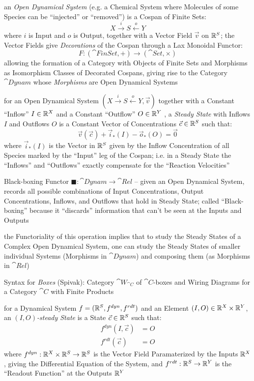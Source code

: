 an \emph{Open Dynamical System} (e.g. a Chemical System where Molecules of some
Species can be ``injected'' or ``removed'') is a Cospan of Finite Sets:
\[
  X \xrightarrow{i} S \xleftarrow{o} Y
\]
where $i$ is Input and $o$ is Output, together with a Vector Field $\vec{v}$ on
$\mathbb{R}^S$; the Vector Fields give \emph{Decorations} of the Cospan through a
Lax Monoidal Functor:
\[
  F : (\cat{FinSet}, +) \rightarrow (\cat{Set}, \times)
\]
allowing the formation of a Category with Objects of Finite Sets and Morphisms
as Isomorphism Classes of Decorated Cospans, giving rise to the Category
$\cat{Dynam}$ whose \emph{Morphisms} are Open Dynamical Systems

for an Open Dynamical System $(X \xrightarrow{i} S \xleftarrow{o} Y, \vec{v})$
together with a Constant ``Inflow'' $I \in \mathbb{R}^X$ and a Constant ``Outflow''
$O \in \mathbb{R}^Y$ , a \emph{Steady State} with Inflows $I$ and Outflows $O$ is a
Constant Vector of Concentrations $\vec{c} \in \mathbb{R}^S$ such that:
\[
  \vec{v}(\vec{c}) + \vec{i}_*(I) - \vec{o}_*(O) = \vec{0}
\]
where $\vec{i}_*(I)$ is the Vector in $\mathbb{R}^S$ given by the Inflow
Concentration of all Species marked by the ``Input'' leg of the Cospan; i.e. in
a Steady State the ``Inflows'' and ``Outflows'' exactly compensate for the
``Reaction Velocities''

Black-boxing Functor $\blacksquare : \cat{Dynam} \rightarrow \cat{Rel}$ --
given an Open Dynamical System, records all possible combinations of Input
Concentrations, Output Concentrations, Inflows, and Outflows that hold in
Steady State; called ``Black-boxing'' because it ``discards'' information that
can't be seen at the Inputs and Outputs

the Functoriality of this operation implies that to study the Steady States of
a Complex Open Dynamical System, one can study the Steady States of smaller
individual Systems (Morphisms in $\cat{Dynam}$) and composing them (as
Morphisms in $\cat{Rel}$)

Syntax for \emph{Boxes} (Spivak):
Category $\cat{W}_{\cat{C}}$ of $\cat{C}$-boxes and Wiring Diagrams for a
Category $\cat{C}$ with Finite Products

for a Dynamical System $f = (\mathbb{R}^S, f^{dyn}, f^{rdt})$ and an Element $(I,O)
\in \mathbb{R}^X \times \mathbb{R}^Y$, an \emph{$(I,O)$-steady State} is a State
$\vec{c} \in \mathbb{R}^S$ such that:
\begin{align*}
  f^{dyn}(I,\vec{c}) & = O \\
  f^{rdt}(\vec{c})   & = O
\end{align*}
where $f^{dyn} : \mathbb{R}^X \times \mathbb{R}^S \rightarrow \mathbb{R}^S$ is the Vector
Field Paramaterized by the Inputs $\mathbb{R}^X$, giving the Differential Equation
of the System, and $f^{rdt} : \mathbb{R}^S \rightarrow \mathbb{R}^Y$ is the ``Readout
Function'' at the Outputs $\mathbb{R}^Y$

